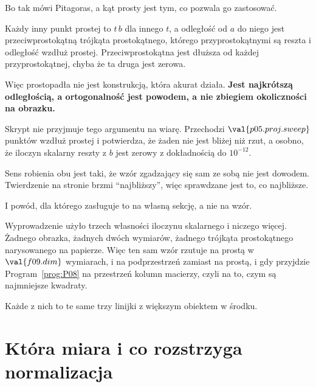 \begin{fr}
\begin{ansblock}
Bo tak mówi Pitagoras, a kąt prosty jest tym, co pozwala go zastosować.
\end{ansblock}

Każdy inny punkt prostej to $t\,b$ dla innego $t$, a odległość od $a$ do niego
jest przeciwprostokątną trójkąta prostokątnego, którego przyprostokątnymi są
reszta i odległość wzdłuż prostej. Przeciwprostokątna jest dłuższa od każdej
przyprostokątnej, chyba że ta druga jest zerowa.

Więc prostopadła nie jest konstrukcją, która akurat działa. \textbf{Jest
najkrótszą odległością, a ortogonalność jest powodem, a nie zbiegiem
okoliczności na obrazku.}
\end{fr}


\begin{fr}
\begin{note}
Skrypt nie przyjmuje tego argumentu na wiarę. Przechodzi
$\val{p05.proj.sweep}$ punktów wzdłuż prostej i potwierdza, że żaden nie jest
bliżej niż rzut, a osobno, że iloczyn skalarny reszty z $b$ jest zerowy z
dokładnością do $10^{-12}$.

Sens robienia obu jest taki, że wzór zgadzający się sam ze sobą nie jest
dowodem. Twierdzenie na stronie brzmi \enquote{najbliższy}, więc sprawdzane
jest to, co najbliższe.
\end{note}
\end{fr}

\begin{fr}
I powód, dla którego zasługuje to na własną sekcję, a nie na wzór.

Wyprowadzenie użyło trzech własności iloczynu skalarnego i niczego więcej.
Żadnego obrazka, żadnych dwóch wymiarów, żadnego trójkąta prostokątnego
narysowanego na papierze. Więc ten sam wzór rzutuje na prostą w $\val{f09.dim}$
wymiarach, i na podprzestrzeń zamiast na prostą, i \dash{} gdy przyjdzie
Program~\ref{prog:P08} \dash{} na przestrzeń kolumn macierzy, czyli na to, czym
są najmniejsze kwadraty.

Każde z nich to te same trzy linijki z większym obiektem w środku.
\end{fr}

\section{Która miara i co rozstrzyga normalizacja}
\label{sec:P05-choosing}

